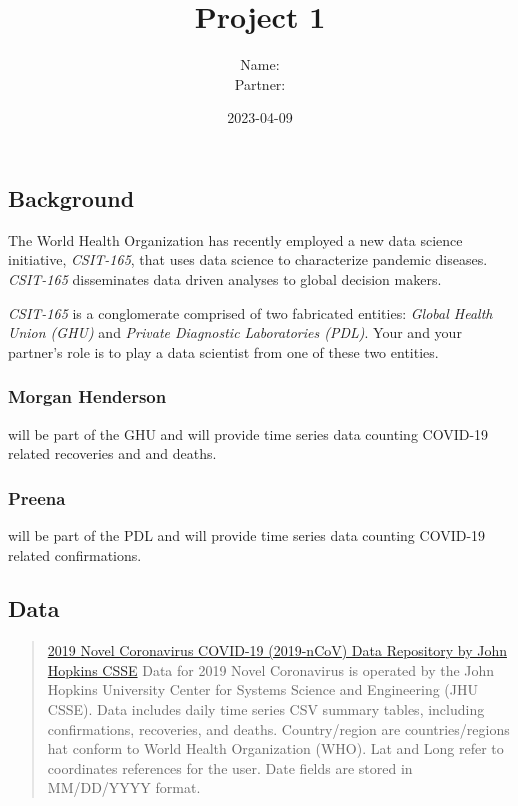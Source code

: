 \documentclass[
]{article}
\title{Project 1}
\author{Name:\\
Partner:}
\date{2023-04-09}
\begin{document}
\maketitle

{
\setcounter{tocdepth}{3}
\tableofcontents
}
\hypertarget{background}{%
\subsection{Background}\label{background}}

The World Health Organization has recently employed a new data science
initiative, \emph{CSIT-165}, that uses data science to characterize
pandemic diseases. \emph{CSIT-165} disseminates data driven analyses to
global decision makers.

\emph{CSIT-165} is a conglomerate comprised of two fabricated entities:
\emph{Global Health Union (GHU)} and \emph{Private Diagnostic
Laboratories (PDL)}. Your and your partner's role is to play a data
scientist from one of these two entities.

\hypertarget{morgan-henderson}{%
\subsubsection{Morgan Henderson}\label{morgan-henderson}}

will be part of the GHU and will provide time series data counting
COVID-19 related recoveries and and deaths.

\hypertarget{preena}{%
\subsubsection{Preena}\label{preena}}

will be part of the PDL and will provide time series data counting
COVID-19 related confirmations.

\hypertarget{data}{%
\subsection{Data}\label{data}}

\begin{quote}
\href{https://github.com/CSSEGISandData/COVID-19/tree/master/csse_covid_19_data/csse_covid_19_time_series}{2019
Novel Coronavirus COVID-19 (2019-nCoV) Data Repository by John Hopkins
CSSE} Data for 2019 Novel Coronavirus is operated by the John Hopkins
University Center for Systems Science and Engineering (JHU CSSE). Data
includes daily time series CSV summary tables, including confirmations,
recoveries, and deaths. Country/region are countries/regions hat conform
to World Health Organization (WHO). Lat and Long refer to coordinates
references for the user. Date fields are stored in MM/DD/YYYY format.
\end{quote}
\end{document}
